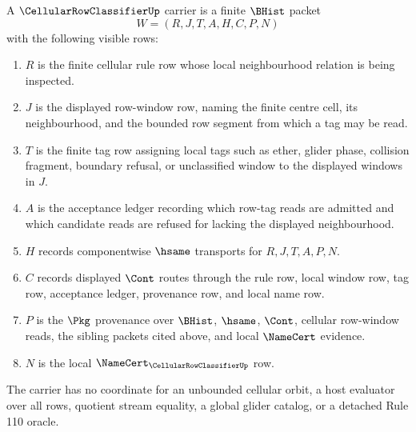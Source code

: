 \begin{definition}
\label{def:cellular-rowclassifier-carrier}
A $\CellularRowClassifierUp$ carrier is a finite $\BHist$ packet
$$
W=(R,J,T,A,H,C,P,N)
$$
with the following visible rows:
\begin{enumerate}
\item $R$ is the finite cellular rule row whose local neighbourhood relation is being inspected.
\item $J$ is the displayed row-window row, naming the finite centre cell, its neighbourhood, and the bounded row segment from which a tag may be read.
\item $T$ is the finite tag row assigning local tags such as ether, glider phase, collision fragment, boundary refusal, or unclassified window to the displayed windows in $J$.
\item $A$ is the acceptance ledger recording which row-tag reads are admitted and which candidate reads are refused for lacking the displayed neighbourhood.
\item $H$ records componentwise $\hsame$ transports for $R,J,T,A,P,N$.
\item $C$ records displayed $\Cont$ routes through the rule row, local window row, tag row, acceptance ledger, provenance row, and local name row.
\item $P$ is the $\Pkg$ provenance over $\BHist$, $\hsame$, $\Cont$, cellular row-window reads, the sibling packets cited above, and local $\NameCert$ evidence.
\item $N$ is the local $\NameCert_{\CellularRowClassifierUp}$ row.
\end{enumerate}
The carrier has no coordinate for an unbounded cellular orbit, a host evaluator over all rows, quotient stream equality, a global glider catalog, or a detached Rule 110 oracle.
\end{definition}

